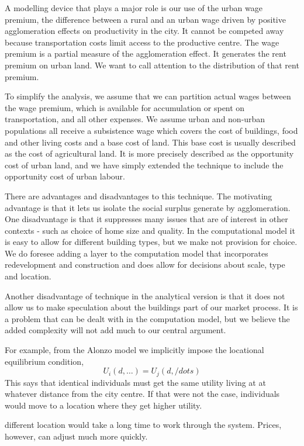 A modelling device that plays a major role is our use of the urban wage premium, the difference between a rural and an urban wage driven by positive agglomeration effects on productivity in the city. It cannot be competed away because transportation costs limit access to the productive centre. The wage premium is a partial measure of the agglomeration effect. It generates the rent premium on urban land. We want to call attention to the distribution of that rent premium.

To simplify the analysis, we assume that we can partition actual wages between the wage premium, which is available for accumulation or spent on transportation, and all other expenses. We assume urban and non-urban populations all receive a subsistence wage which covers  the cost of buildings, food and other living costs and a base cost of land. This base cost is usually described as the cost of agricultural land. It is more precisely described as the opportunity cost of urban land, and we have simply extended the technique to include the opportunity cost of urban labour. 

There are advantages and disadvantages to this technique. The motivating advantage is that it lets us isolate the social surplus generate by agglomeration. One disadvantage is that it suppresses many issues that are of interest in other contexts - such as choice of home size and quality. In the computational model it is easy to allow for different building types, but we make not provision for choice. We do foresee adding a layer to the computation  model that incorporates redevelopment and construction and does allow for decisions about scale, type and location. 

Another disadvantage of technique in the analytical version is that it does not allow us to make speculation about the buildings part of our market process. It is a problem that can be dealt with in the computation model, but we believe the added complexity will not add much to our central argument.


For example, from the Alonzo model we implicitly impose the locational equilibrium condition,
\[U_i(d,\dots)=U_j(d, /dots)\]
This says that identical individuals must get the same utility living at at whatever distance from the city centre. If that were not the case, individuals would move to a location where they get higher utility.

different location would take a long time to work through the system. Prices, however, can adjust much more quickly. 

